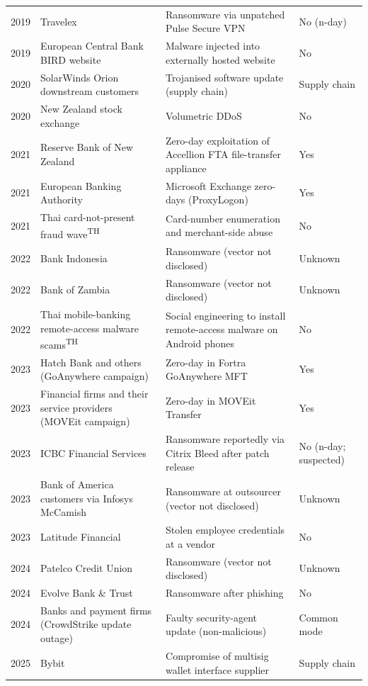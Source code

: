 \begin{longtable}{p{}p{}p{}p{}}
2019 & Travelex & Ransomware via unpatched Pulse Secure VPN & No (n-day) \\
2019 & European Central Bank BIRD website & Malware injected into externally hosted website & No \\
2020 & SolarWinds Orion downstream customers & Trojanised software update (supply chain) & Supply chain \\
2020 & New Zealand stock exchange & Volumetric DDoS & No \\
2021 & Reserve Bank of New Zealand & Zero-day exploitation of Accellion FTA file-transfer appliance & Yes \\
2021 & European Banking Authority & Microsoft Exchange zero-days (ProxyLogon) & Yes \\
2021 & Thai card-not-present fraud wave\textsuperscript{TH} & Card-number enumeration and merchant-side abuse & No \\
2022 & Bank Indonesia & Ransomware (vector not disclosed) & Unknown \\
2022 & Bank of Zambia & Ransomware (vector not disclosed) & Unknown \\
2022 & Thai mobile-banking remote-access malware scams\textsuperscript{TH} & Social engineering to install remote-access malware on Android phones & No \\
2023 & Hatch Bank and others (GoAnywhere campaign) & Zero-day in Fortra GoAnywhere MFT & Yes \\
2023 & Financial firms and their service providers (MOVEit campaign) & Zero-day in MOVEit Transfer & Yes \\
2023 & ICBC Financial Services & Ransomware reportedly via Citrix Bleed after patch release & No (n-day; suspected) \\
2023 & Bank of America customers via Infosys McCamish & Ransomware at outsourcer (vector not disclosed) & Unknown \\
2023 & Latitude Financial & Stolen employee credentials at a vendor & No \\
2024 & Patelco Credit Union & Ransomware (vector not disclosed) & Unknown \\
2024 & Evolve Bank \& Trust & Ransomware after phishing & No \\
2024 & Banks and payment firms (CrowdStrike update outage) & Faulty security-agent update (non-malicious) & Common mode \\
2025 & Bybit & Compromise of multisig wallet interface supplier & Supply chain \\
\end{longtable}